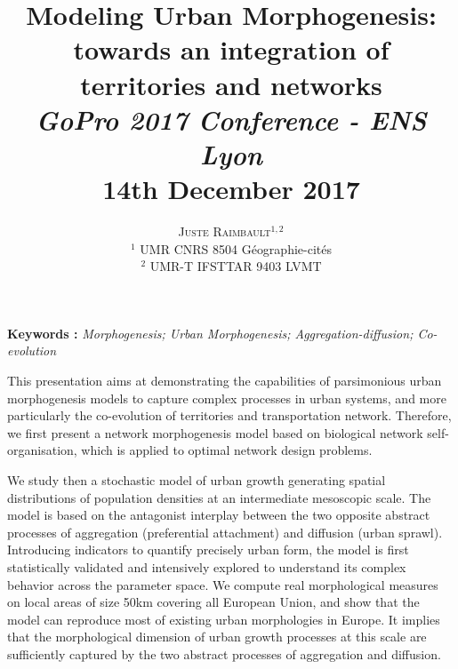 \documentclass[11pt]{article}
\newcommand{\noun}[1]{\textsc{#1}}
\begin{document}
\title{\vspace{-2cm}Modeling Urban Morphogenesis: towards an integration of territories and networks
\bigskip\\
\textit{GoPro 2017 Conference - ENS Lyon}\\
14th December 2017
}
\author{\noun{Juste Raimbault}$^{1,2}$\medskip\\
$^1$ UMR CNRS 8504 G{\'e}ographie-cit{\'e}s\\
$^2$ UMR-T IFSTTAR 9403 LVMT
}
\date{}

\maketitle

\justify



\textbf{Keywords : }\textit{Morphogenesis; Urban Morphogenesis; Aggregation-diffusion; Co-evolution}

\bigskip

This presentation aims at demonstrating the capabilities of parsimonious urban morphogenesis models to capture complex processes in urban systems, and more particularly the co-evolution of territories and transportation network. Therefore, we first present a network morphogenesis model based on biological network self-organisation, which is applied to optimal network design problems.

We study then a stochastic model of urban growth generating spatial distributions of population densities at an intermediate mesoscopic scale. The model is based on the antagonist interplay between the two opposite abstract processes of aggregation (preferential attachment) and diffusion (urban sprawl). Introducing indicators to quantify precisely urban form, the model is first statistically validated and intensively explored to understand its complex behavior across the parameter space. We compute real morphological measures on local areas of size 50km covering all European Union, and show that the model can reproduce most of existing urban morphologies in Europe. It implies that the morphological dimension of urban growth processes at this scale are sufficiently captured by the two abstract processes of aggregation and diffusion.
\end{document}
